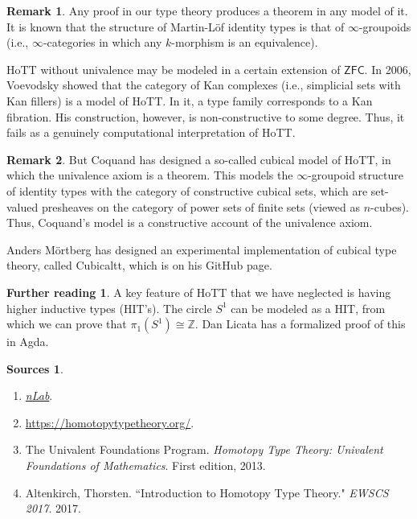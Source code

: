 \documentclass[10pt,letterpaper,cm]{nupset}
\theoremstyle{definition}
\newtheorem*{further}{Further reading}
\newtheorem*{sources}{Sources}
\newtheorem{remark}{Remark}
\newcommand{\Z}{\mathbb Z}
\newcommand{\1}{\mathbf{1}}
\newcommand{\0}{\vec 0}
\begin{document}
\begin{remark} Any proof in our type theory produces a theorem in any model of it. It is known that the structure of Martin-L\"of identity types is that of $\infty$-groupoids (i.e., $\infty$-categories in which any $k$-morphism is an equivalence).

HoTT without univalence may be modeled in a certain extension of $\mathsf{ZFC}$. In 2006, Voevodsky showed that the category of Kan complexes (i.e., simplicial sets with Kan fillers) is a model of HoTT.  In it, a type family corresponds to a Kan fibration.  His construction, however, is non-constructive to some degree. Thus, it fails as a genuinely computational interpretation of HoTT.
\end{remark}

\begin{remark}
But Coquand has designed a so-called cubical model of HoTT, in which the univalence axiom is a theorem. This models the $\infty$-groupoid structure of identity types with the category of constructive cubical sets, which are set-valued presheaves on the category of power sets of finite sets (viewed as $n$-cubes). Thus, Coquand's model is a constructive account of the univalence axiom.  

Anders M\"ortberg has designed an experimental implementation of cubical type theory, called Cubicaltt, which is on his GitHub page.
\end{remark}

\begin{further}
A key feature of HoTT that we have neglected is having higher inductive types (HIT's). The circle $S^1$ can be modeled as a HIT, from which we can prove that $\pi_1(S^1) \cong \Z$. Dan Licata has a formalized proof of this in Agda.
\end{further}

\begin{sources} $ $
\begin{enumerate}
\item \href{https://ncatlab.org/nlab/show/HomePage}{\textit{nLab}}.
\item \url{https://homotopytypetheory.org/}.
\item The Univalent Foundations Program. \textit{Homotopy Type Theory: Univalent Foundations of Mathematics}. First edition, 2013.
\item Altenkirch, Thorsten. ``Introduction to Homotopy Type Theory." \textit{EWSCS 2017}. 2017.
\end{enumerate}
\end{sources}
\end{document}

